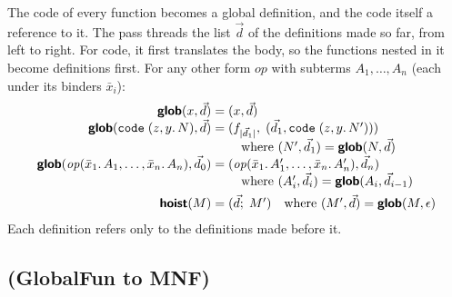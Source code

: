 The code of every function becomes a global definition, and the code
itself a reference to it. The pass threads the list $\vec{d}$ of the
definitions made so far, from left to right. For code, it first
translates the body, so the functions nested in it become definitions
first. For any other form $\mathit{op}$ with subterms $A_1, \ldots,
A_n$ (each under its binders $\bar{x}_i$):
\[
\begin{array}{@{}r@{\;}c@{\;}l@{}}
  \pass{glob}(x, \vec{d}) & = & (x, \vec{d})\\
  \pass{glob}(\kw{code}\;(z, y.\,N), \vec{d}) & = &
    (f_{|\vec{d}_1|},\; (\vec{d}_1, \kw{code}\;(z, y.\,N')))\\
  & & \quad \text{where } (N', \vec{d}_1) = \pass{glob}(N, \vec{d})\\
  \pass{glob}(\mathit{op}(\bar{x}_1.\,A_1, \ldots, \bar{x}_n.\,A_n), \vec{d}_0) & = &
    (\mathit{op}(\bar{x}_1.\,A'_1, \ldots, \bar{x}_n.\,A'_n), \vec{d}_n)\\
  & & \quad \text{where } (A'_i, \vec{d}_i) = \pass{glob}(A_i, \vec{d}_{i-1})\\[4pt]
  \pass{hoist}(M) & = & (\vec{d};\; M')
    \quad \text{where } (M', \vec{d}) = \pass{glob}(M, \epsilon)
\end{array}
\]
Each definition refers only to the definitions made before it.

\subsection{ (GlobalFun to MNF)}
\label{app:pass-rco}

